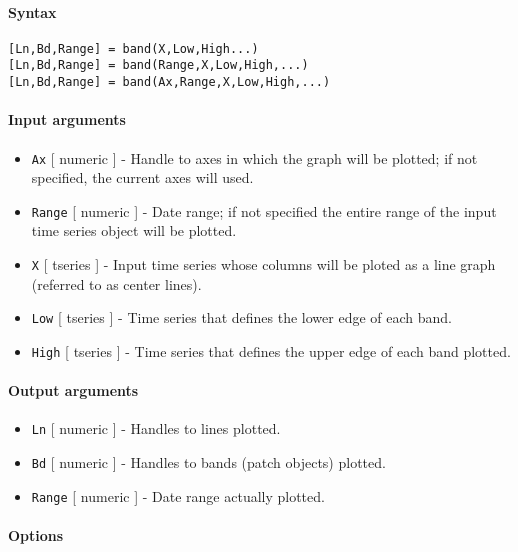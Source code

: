 


	\paragraph{Syntax}

\begin{verbatim}
[Ln,Bd,Range] = band(X,Low,High...)
[Ln,Bd,Range] = band(Range,X,Low,High,...)
[Ln,Bd,Range] = band(Ax,Range,X,Low,High,...)
\end{verbatim}

\paragraph{Input arguments}

\begin{itemize}
\item
  \texttt{Ax} {[} numeric {]} - Handle to axes in which the graph will
  be plotted; if not specified, the current axes will used.
\item
  \texttt{Range} {[} numeric {]} - Date range; if not specified the
  entire range of the input time series object will be plotted.
\item
  \texttt{X} {[} tseries {]} - Input time series whose columns will be
  ploted as a line graph (referred to as center lines).
\item
  \texttt{Low} {[} tseries {]} - Time series that defines the lower edge
  of each band.
\item
  \texttt{High} {[} tseries {]} - Time series that defines the upper
  edge of each band plotted.
\end{itemize}

\paragraph{Output arguments}

\begin{itemize}
\item
  \texttt{Ln} {[} numeric {]} - Handles to lines plotted.
\item
  \texttt{Bd} {[} numeric {]} - Handles to bands (patch objects)
  plotted.
\item
  \texttt{Range} {[} numeric {]} - Date range actually plotted.
\end{itemize}

\paragraph{Options}

